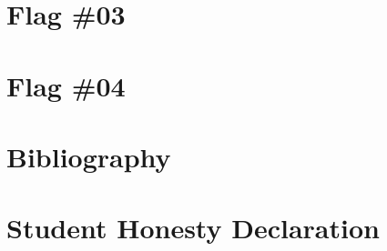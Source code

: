 \section{Flag \#03}

%
\newpage


\section{Flag \#04}


%

\newpage

\section{Bibliography}

\renewcommand{\refname}{\spacedlowsmallcaps{References}} %



%


%


\section{Student Honesty Declaration}





